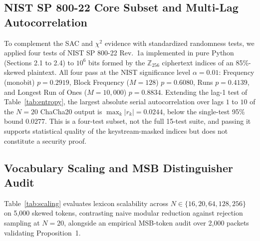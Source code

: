 \documentclass[conference]{IEEEtran}
\begin{document}
\subsection{NIST SP 800-22 Core Subset and Multi-Lag Autocorrelation}
To complement the SAC and $\chi^2$ evidence with standardized randomness tests, we applied four tests of NIST SP 800-22 Rev.~1a implemented in pure Python (Sections 2.1 to 2.4) to $10^6$ bits formed by the $\mathbb{Z}_{256}$ ciphertext indices of an 85\%-skewed plaintext. All four pass at the NIST significance level $\alpha = 0.01$: Frequency (monobit) $p = 0.2919$, Block Frequency ($M=128$) $p = 0.6080$, Runs $p = 0.4139$, and Longest Run of Ones ($M=10{,}000$) $p = 0.8834$. Extending the lag-1 test of Table~\ref{tab:entropy}, the largest absolute serial autocorrelation over lags $1$ to $10$ of the $N=20$ ChaCha20 output is $\max_k |r_k| = 0.0244$, below the single-test 95\% bound $0.0277$. This is a four-test subset, not the full 15-test suite, and passing it supports statistical quality of the keystream-masked indices but does not constitute a security proof.

\subsection{Vocabulary Scaling and MSB Distinguisher Audit}
Table~\ref{tab:scaling} evaluates lexicon scalability across $N \in \{16, 20, 64, 128, 256\}$ on 5,000 skewed tokens, contrasting naive modular reduction against rejection sampling at $N=20$, alongside an empirical MSB-token audit over 2,000 packets validating Proposition~1.
\end{document}
